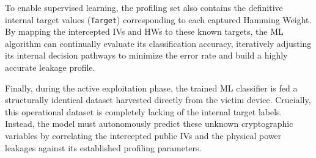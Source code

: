 \documentclass[11pt,a4paper]{report}
\begin{document}
\begin{table}[htbp]
    \centering
    \footnotesize
    \setlength{\tabcolsep}{3.5pt}
    \caption{Sample entries from the clone device's training dataset, displaying the public Initialization Vector (IV), sequential Hamming Weight features ($\text{HW}_0 \dots \text{HW}_{31}$), and the definitive target ciphertext byte values ($\text{Target}_0 \dots \text{Target}_{31}$).}
    \label{tab:training_data_sample}
\end{table}

To enable supervised learning, the profiling set also contains the definitive internal target values (\texttt{Target}) corresponding to each captured Hamming Weight. 
By mapping the intercepted IVs and HWs to these known targets, the ML algorithm can continually evaluate its classification accuracy, 
iteratively adjusting its internal decision pathways to minimize the error rate and build a highly accurate leakage profile.

Finally, during the active exploitation phase, the trained ML classifier is fed a structurally identical dataset harvested directly from the victim device. 
Crucially, this operational dataset is completely lacking of the internal target labels. 
Instead, the model must autonomously predict these unknown cryptographic variables by correlating the intercepted public IVs and the physical power leakages against its established profiling parameters.
\end{document}
